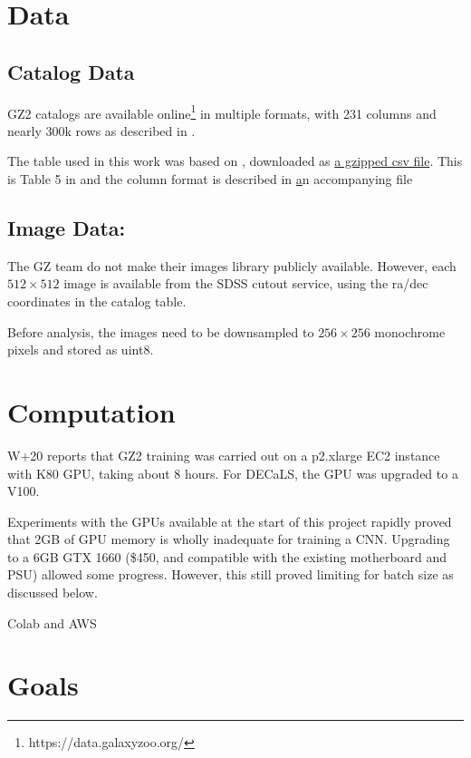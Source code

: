 \documentclass[twocolumn, twocolappendix, tighten]{aastex631}
\newcommand{\todo}{\color{red}{TODO}\color{black}\hspace{2mm}}
\begin{document}
\section{Data} \label{sec:data}

\subsection{Catalog Data} 

GZ2 catalogs are available online\footnote{https://data.galaxyzoo.org/} in multiple formats, with 231 columns and nearly 300k rows as described in \citet{willett_galaxy_2013}.

The table used in this work was based on \citet{2016MNRAS.461.3663H}, downloaded as \href{https://zooniverse-data.s3.amazonaws.com/galaxy-zoo-2/zoo2MainSpecz.csv.gz}{a gzipped csv file}.  This is Table 5 in \citet{willett_galaxy_2013} and the column format is described in \href{https://data.galaxyzoo.org/data/gz2/zoo2MainSpecz.txt} an accompanying file

\subsection{Image Data:} 
The GZ team do not make their images library publicly available. However, each $512 \times 512$ image is available from the SDSS cutout service, using the ra/dec coordinates in the catalog table.

Before analysis, the images need to be downsampled to $256 \times 256$ monochrome pixels and stored as uint8.



\section{Computation} \label{sec:comp}

W+20 reports that GZ2 training was carried out on a p2.xlarge EC2 instance with K80 GPU, taking about 8 hours. For DECaLS, the GPU was upgraded to a V100.

Experiments with the GPUs available at the start of this project rapidly proved that 2GB of GPU memory is wholly inadequate for training a CNN. Upgrading to a 6GB GTX 1660 (\$450, and compatible with the existing motherboard and PSU) allowed some progress. However, this still proved limiting for batch size as discussed below.

\todo Colab and AWS


\section{Goals} \label{sec:goals}
\end{document}

